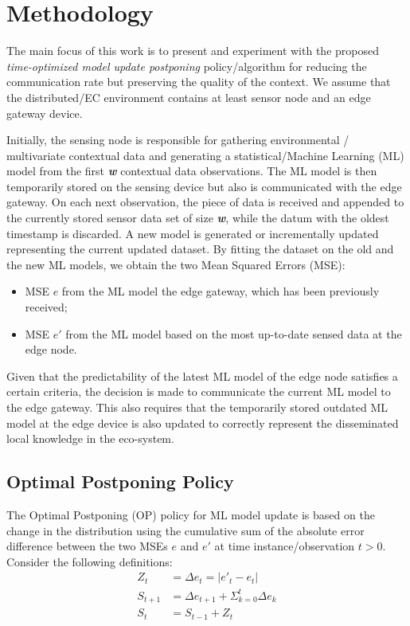 \documentclass{mpaper}
\begin{document}
\section{Methodology}
The main focus of this work is to present and experiment with the
proposed \textit{time-optimized model update postponing} policy/algorithm for reducing the communication rate but preserving the quality of the context. We assume that the distributed/EC environment contains at least sensor node and an edge gateway device. 

Initially, the sensing node is responsible for gathering environmental / multivariate contextual data and generating a statistical/Machine Learning (ML) model from the first \textbf{\emph{w}} contextual data observations. The ML model is then temporarily stored on the sensing device but also is communicated with the edge gateway. 
On each next observation, the piece of data is received and appended to the currently stored sensor data set of size \textbf{\emph{w}}, while the datum with the oldest timestamp is discarded. 
A new model is generated or incrementally updated representing the current updated dataset. By fitting the dataset on the old and the new ML models, we obtain the two Mean Squared Errors (MSE):
\begin{itemize}
    \item MSE \textbf{$e$} from the ML model the edge gateway, which has been previously received;
\item MSE \textbf{$e'$} from the ML model based on the most up-to-date sensed data at the edge node.
\end{itemize}

Given that the predictability of the latest ML model of the edge node satisfies a certain criteria, the decision is made to communicate the current ML model to the edge gateway. This also requires that the temporarily stored outdated ML model at the edge device is also updated to correctly represent the disseminated local knowledge in the eco-system.

\subsection{Optimal Postponing Policy}
The Optimal Postponing (OP) policy for ML model update is based on the change in the distribution using the cumulative sum of the absolute error difference between the two MSEs $e$ and $e'$ at time instance/observation $t>0$. Consider the following definitions:
\begin{align}
    Z_t &= \Delta e_t = | e'_t - e_t |\\
    S_{t+1} &= \Delta e_{t+1} + \Sigma_{k=0}^t \Delta e_k\\
    S_t &= S_{t-1} + Z_t\label{eq:1}
\end{align}
\end{document}
